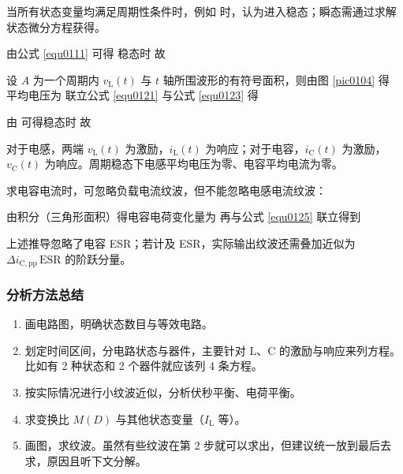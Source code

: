 
当所有状态变量均满足周期性条件时，例如
时，认为进入稳态；瞬态需通过求解状态微分方程获得。


由公式 \eqref{equ0111} 可得
稳态时
故

设 $A$ 为一个周期内 $v_{\mathrm{L}}(t)$ 与 $t$ 轴所围波形的有符号面积，则由图 \ref{pic0104} 得
平均电压为
联立公式 \eqref{equ0121} 与公式 \eqref{equ0123} 得


由
可得稳态时
故

对于电感，两端 $v_{\mathrm{L}}(t)$ 为激励，$i_{\mathrm{L}}(t)$ 为响应；对于电容，$i_{\mathrm{C}}(t)$ 为激励，$v_{\mathrm{C}}(t)$ 为响应。周期稳态下电感平均电压为零、电容平均电流为零。


求电容电流时，可忽略负载电流纹波，但不能忽略电感电流纹波：

\newpage{}


由积分（三角形面积）得电容电荷变化量为
再与公式 \eqref{equ0125} 联立得到

上述推导忽略了电容 ESR；若计及 ESR，实际输出纹波还需叠加近似为 $\Delta i_{\mathrm{C,pp}}\,\mathrm{ESR}$ 的阶跃分量。

\vspace{1cm}

\subsubsection*{\heiti{}分析方法总结}

\begin{enumerate}
  \setlength{\itemsep}{-0.25\baselineskip}
  \setlength{\parsep}{0pt}
  \item 画电路图，明确状态数目与等效电路。
  \item 划定时间区间，分电路状态与器件，主要针对 $\mathrm{L}$、$\mathrm{C}$ 的激励与响应来列方程。比如有 2 种状态和 2 个器件就应该列 4 条方程。
  \item 按实际情况进行小纹波近似，分析伏秒平衡、电荷平衡。
  \item 求变换比 $M(D)$ 与其他状态变量（$I_{\mathrm{L}}$ 等）。
  \item 画图，求纹波。虽然有些纹波在第 2 步就可以求出，但建议统一放到最后去求，原因且听下文分解。
\end{enumerate}

